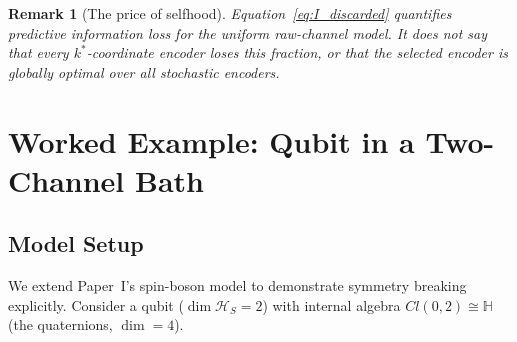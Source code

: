 \documentclass[12pt]{article}
\newtheorem{remark}[theorem]{Remark}
\begin{document}
\begin{remark}[The price of selfhood]
\label{rem:price}
Equation~\eqref{eq:I_discarded} quantifies predictive information loss
for the uniform raw-channel model.  It does not say that every
$k^*$-coordinate encoder loses this fraction, or that the selected
encoder is globally optimal over all stochastic encoders.
\end{remark}

\section{Worked Example: Qubit in a Two-Channel Bath}
\label{sec:example}

\subsection{Model Setup}
\label{subsec:model}

We extend Paper~I's spin-boson model to demonstrate
symmetry breaking explicitly.
Consider a qubit ($\dim \mathcal{H}_S = 2$) with internal
algebra $Cl(0,2) \cong \mathbb{H}$ (the quaternions,
$\dim = 4$).
\end{document}
